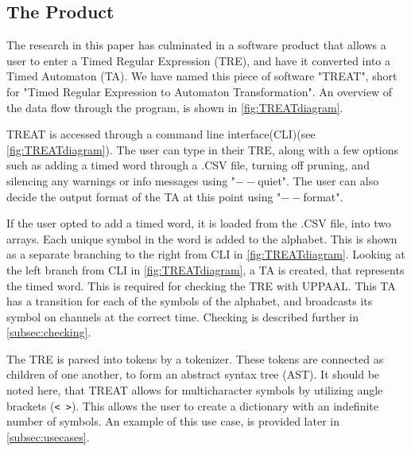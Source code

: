\subsection{The Product}\label{subsec:theProduct}
The research in this paper has culminated in a software product that allows a user to enter a Timed Regular Expression (TRE), and have it converted into a Timed Automaton (TA).
We have named this piece of software "TREAT", short for "Timed Regular Expression to Automaton Transformation".
An overview of the data flow through the program, is shown in \cref{fig:TREATdiagram}.

\begin{center}
    
\end{center}
\vspace{0.75em}


TREAT is accessed through a command line interface(CLI)(see \cref{fig:TREATdiagram}). The user can type in their TRE, along with a few options such as adding a timed word through a .CSV file, turning off pruning, and silencing any warnings or info messages using "$--$quiet".
The user can also decide the output format of the TA at this point using "$--$format".

\vspace{.5\baselineskip plus 2pt}
If the user opted to add a timed word, it is loaded from the .CSV file, into two arrays. Each unique symbol in the word is added to the alphabet. This is shown as a separate branching to the right from CLI in \cref{fig:TREATdiagram}.
Looking at the left branch from CLI in \cref{fig:TREATdiagram}, a TA is created, that represents the timed word. This is required for checking the TRE with UPPAAL. This TA has a transition for each of the symbols of the alphabet, and broadcasts its symbol on channels at the correct time. Checking is described further in \cref{subsec:checking}.

\vspace{.5\baselineskip plus 2pt}
The TRE is parsed into tokens by a tokenizer. These tokens are connected as children of one another, to form an abstract syntax tree (AST).
It should be noted here, that TREAT allows for multicharacter symbols by utilizing angle brackets (\verb|< >|). This allows the user to create a dictionary with an indefinite number of symbols. An example of this use case, is provided later in \cref{subsec:usecases}.

